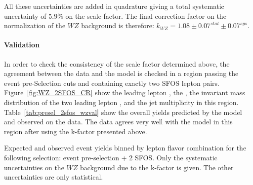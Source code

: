 All these uncertainties are added in quadrature giving a total systematic uncertainty of $5.9\%$ on the scale factor. The final correction factor on the normalization of the $WZ$ background is therefore: $k_{WZ}=1.08 \pm 0.07^{stat} \pm 0.07^{sys}$.

\paragraph{Validation}

In order to check the consistency of the scale factor determined above, the agreement between the data and the model is checked in a region passing the event pre-Selection cuts and containing exactly two SFOS lepton pairs. Figure~\ref{fig:WZ_2SFOS_CR} show the leading lepton \pt{}, the \MET{}, the invariant mass distribution of the two leading lepton \pt{}, and the jet multiplicity in this region. Table~\ref{tab:presel_2sfos_wzval} show the overall yields predicted by the model and observed on the data. The data agrees very well with the model in this region after using the k-factor presented above.

\begin{table}[ht!]
\centering

\caption{Expected and observed event yields binned by lepton flavor combination for the following selection: event pre-selection + 2 SFOS. Only the systematic uncertainties on the $WZ$ background due to the k-factor is given. The other uncertainties are only statistical.}
\label{tab:presel_2sfos_wzval}
\end{table}


